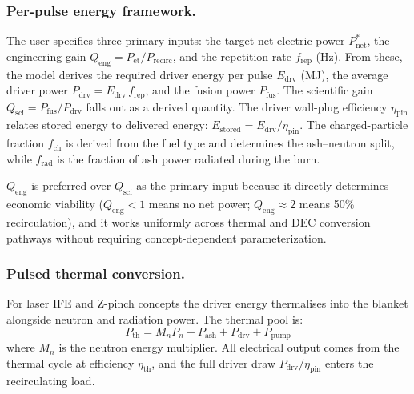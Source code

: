 \documentclass{article}
\begin{document}
\subsubsection{Per-pulse energy framework.}
The user specifies three primary inputs: the target net electric power
$P_{\text{net}}^*$, the engineering gain $Q_{\text{eng}} = P_{\text{et}}
/ P_{\text{recirc}}$, and the repetition rate $f_{\text{rep}}$ (Hz).
From these, the model derives the required driver energy per pulse
$E_{\text{drv}}$ (MJ), the average driver power
$P_{\text{drv}} = E_{\text{drv}} \, f_{\text{rep}}$, and the fusion
power $P_{\text{fus}}$.  The scientific gain
$Q_{\text{sci}} = P_{\text{fus}} / P_{\text{drv}}$ falls out as a
derived quantity.  The driver wall-plug efficiency $\eta_{\text{pin}}$
relates stored energy to delivered energy:
$E_{\text{stored}} = E_{\text{drv}} / \eta_{\text{pin}}$.
The charged-particle fraction $f_{\text{ch}}$ is derived from the fuel
type and determines the ash--neutron split, while
$f_{\text{rad}}$ is the fraction of ash power radiated during the burn.

$Q_{\text{eng}}$ is preferred over $Q_{\text{sci}}$ as the primary input
because it directly determines economic viability ($Q_{\text{eng}} < 1$
means no net power; $Q_{\text{eng}} \approx 2$ means 50\% recirculation),
and it works uniformly across thermal and DEC conversion pathways without
requiring concept-dependent parameterization.

\subsubsection{Pulsed thermal conversion.}
For laser IFE and Z-pinch concepts the driver energy thermalises into
the blanket alongside neutron and radiation power.  The thermal pool
is:
\begin{equation}
P_{\text{th}} = M_n P_n + P_{\text{ash}} + P_{\text{drv}} + P_{\text{pump}}
\end{equation}
where $M_n$ is the neutron energy multiplier.  All electrical output
comes from the thermal cycle at efficiency $\eta_{\text{th}}$, and
the full driver draw $P_{\text{drv}}/\eta_{\text{pin}}$ enters the
recirculating load.
\end{document}
